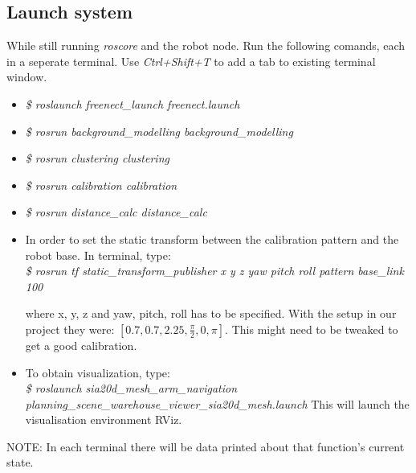 \documentclass[10pt,a4paper]{article}
\begin{document}
\subsection{Launch system}
While still running \textit{roscore} and the robot node. Run the following comands, each in a seperate terminal.
Use \textit{Ctrl+Shift+T} to add a tab to existing terminal window.
\begin{itemize}
\item \textit{\$ roslaunch freenect\_launch freenect.launch}

\item \textit{\$ rosrun background\_modelling background\_modelling}

\item \textit{\$ rosrun clustering clustering}

\item \textit{\$ rosrun calibration calibration}

\item \textit{\$ rosrun distance\_calc distance\_calc}

\item In order to set the static transform between the calibration pattern and the robot base. In terminal, type:\\
 \textit{\$ rosrun tf static\_transform\_publisher x y z yaw pitch roll pattern base\_link 100}
 
where x, y, z and yaw, pitch, roll has to be specified. With the setup in our project they were: $\left[0.7, 0.7, 2.25, \frac{\pi}{2}, 0, \pi \right].$ This might need to be tweaked to get a good calibration.

\item To obtain visualization, type:\\
\textit{\$ roslaunch sia20d\_mesh\_arm\_navigation planning\_scene\_warehouse\_viewer\_sia20d\_mesh.launch}
This will launch the visualisation environment RViz.

\end{itemize}
NOTE: In each terminal there will be data printed about that function's current state.
\end{document}
